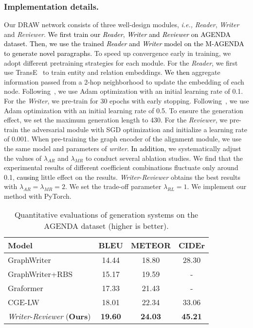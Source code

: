 \documentclass[letterpaper]{article}
\def\hmg{\textcolor{black}}
\def\ie{\emph{i.e., }}
\begin{document}
\subsubsection{Implementation details.} 
Our DRAW network consists of three well-design modules, \ie{\textit{Reader}, \textit{Writer} and \textit{Reviewer}.}
\hmg{We first train our \textit{Reader}, \textit{Writer} and \textit{Reviewer} on AGENDA dataset. Then, we use the trained \textit{Reader} and \textit{Writer} model on the M-AGENDA to generate novel paragraphs.}
To speed up convergence early in training, we adopt different pretraining strategies for each module. For the \textit{Reader},
we first use TransE~\cite{NIPS2013_5071} to train entity and relation embeddings. 
\hmg{We then} aggregate information passed from a 2-hop neighborhood to update the embedding of each node.
Following~\cite{Nathani2019LearningAE}, we use Adam optimization with an initial learning rate of 0.1. 
For the \textit{Writer}, we pre-train for 30 epochs with early stopping. Following~\cite{ribeiro2020modeling}, we use Adam optimization with an initial learning rate of 0.5. To ensure the generation effect, we set the maximum generation length to 430.
For the \textit{Reviewer}, we pre-train the adversarial module with SGD optimization and initialize a learning rate of 0.001. When pre-training the graph encoder of the alignment module, we use the same model and parameters of \textit{writer}. \hmg{In addition}, we systematically adjust the values of $\lambda_{AR}$ and $\lambda_{MR}$ to conduct several ablation studies.
We find that the experimental results of different coefficient combinations 
fluctuate only around 0.1, \hmg{causing} little effect on the results.
\textit{Writer}-\textit{Reviewer} obtains the best results with { $\lambda_{AR} = \lambda_{MR} = 2$. We set the trade-off parameter $\lambda_{RL}=1$}.
We implement our method with PyTorch.


\begin{table}
	\centering
	
	\begin{tabular}{l|c c c }
		\hline
	Model & BLEU & METEOR   &CIDEr
		\\ \hline
		GraphWriter 
		
		& 14.44    & 18.80  &28.30 \\ 
		GraphWriter+RBS  &15.17  & 19.59  &- \\
		Graformer  & 17.33  &21.43  &- \\
		CGE-LW     & 18.01    & 22.34  &33.06  \\ \hline
        \textit{Writer}-\textit{Reviewer} (\textbf{Ours}) & \textbf{19.60}    & \textbf{24.03}  &\textbf{45.21} \\ \hline
	\end{tabular}
	\caption{Quantitative evaluations of generation systems on the AGENDA dataset (higher is better).}
	\label{tab:Automatic Evaluations}
\end{table}
\end{document}
